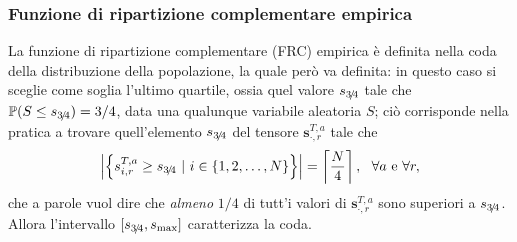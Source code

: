 
      \subsubsection{Funzione di ripartizione complementare empirica}\label{secFRCEmpirica}

        La funzione di ripartizione complementare (FRC) empirica è definita nella coda della distribuzione della popolazione, la quale però va definita: in questo caso si sceglie come soglia l'ultimo quartile, ossia quel valore \(s_{3\hspace{-0.15em}/\hspace{-0.15em}4}\) tale che \(\mathbb P(S\leq s_{3\hspace{-0.15em}/\hspace{-0.15em}4})=3/4\), data una qualunque variabile aleatoria \(S\); ciò corrisponde nella pratica a trovare quell'elemento \(s_{3\hspace{-0.15em}/\hspace{-0.15em}4}\) del tensore \(\mathbf s^{T,a}_{\cdot,r}\) tale che
        \begin{equation*}
          \left\vert\left\{
            s^{T,a}_{i,r}\geq s_{3\hspace{-0.15em}/\hspace{-0.15em}4}\ |\ i\in\{1,2,\ldots,N\}
          \right\}\right\vert=\left\lceil\frac N4\right\rceil,
          \ \ \forall a\text{ e }\forall r,
        \end{equation*}
        che a parole vuol dire che \textit{almeno} \(1/4\) di tutt'i valori di \(\mathbf s^{T,a}_{\cdot,r}\) sono superiori a \(s_{3\hspace{-0.15em}/\hspace{-0.15em}4}\). %
        Allora l'intervallo \([s_{3\hspace{-0.15em}/\hspace{-0.15em}4},s_{\max}]\) caratterizza la coda.

